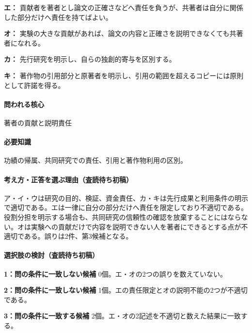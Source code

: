 \noindent\textbf{エ：} 貢献者を著者とし論文の正確さなどへ責任を負うが、共著者は自分に関係した部分だけへ責任を持てばよい。\par

\noindent\textbf{オ：} 実験の大きな貢献があれば、論文の内容と正確さを説明できなくても共著者になれる。\par

\noindent\textbf{カ：} 先行研究を明示し、自らの独創的寄与を区別する。\par

\noindent\textbf{キ：} 著作物の引用部分と原著者を明示し、引用の範囲を超えるコピーには原則として許諾を得る。\par

\paragraph{問われる核心} 著者の貢献と説明責任

\paragraph{必要知識} 功績の帰属、共同研究での責任、引用と著作物利用の区別。

\paragraph{考え方・正答を選ぶ理由（査読待ち初稿）} ア・イ・ウは研究の目的、検証、資金責任、カ・キは先行成果と利用条件の明示で適切である。エは一律に自分の部分だけへ責任を限定しており不適切である。役割分担を明示する場合も、共同研究の信頼性の確認を放棄することにはならない。オは実験への貢献だけで内容を説明できない人を著者にできるとする点が不適切である。誤りは2件、第3候補となる。

\paragraph{選択肢の検討（査読待ち初稿）}\mbox{}\par

\noindent\textbf{1：問の条件に一致しない候補} 0個。エ・オの2つの誤りを数えていない。\par

\noindent\textbf{2：問の条件に一致しない候補} 1個。エの責任限定とオの説明不能の2つが不適切である。\par

\noindent\textbf{3：問の条件に一致する候補} 2個。エ・オの2記述を不適切と数えた結果に一致する。\par

